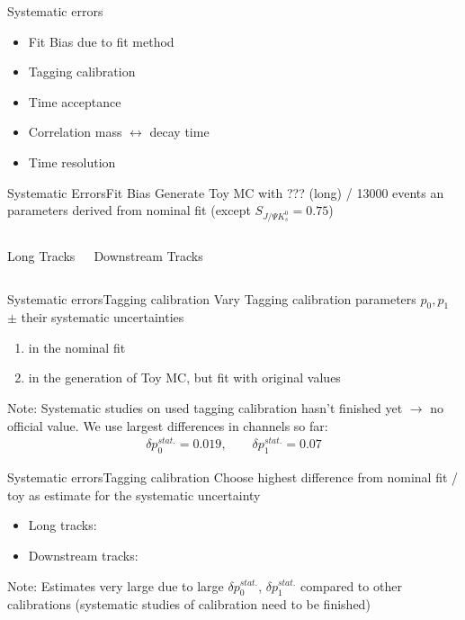 \documentclass{beamer}
\newcommand{\SJPsi}{S_{J/\Psi K_s^0}}
\begin{document}
	
	\begin{frame}{Systematic errors}
	\begin{itemize}
		\item Fit Bias due to fit method
	    \item Tagging calibration
	    \item Time acceptance
	    \item Correlation mass $\leftrightarrow$ decay time
	    \item Time resolution
	\end{itemize}
	\end{frame}
	
	\begin{frame}{Systematic Errors}{Fit Bias}
	Generate Toy MC with ??? (long) / 13000 events an parameters derived from nominal fit (except $\SJPsi = 0.75$)
	\begin{columns}
	\begin{block}{Long Tracks}
	\end{block}
	\begin{block}{Downstream Tracks}
	\end{block}
	\end{columns}
	\end{frame}
	
	\begin{frame}{Systematic errors}{Tagging calibration}
	Vary Tagging calibration parameters $p_0, p_1$ $\pm$ their systematic uncertainties
	\begin{enumerate}
	\item in the nominal fit
	\item in the generation of Toy MC, but fit with original values
	\end{enumerate}
	\begin{alert}{Note:}
	Systematic studies on used tagging calibration hasn't finished yet $\longrightarrow$ no official value. We use largest differences in channels so far:
	\begin{align*}
	\delta p_0^{stat.} = 0.019, \qquad \delta p_1^{stat.} = 0.07
	\end{align*}
	\end{alert}
	\end{frame}
	
	\begin{frame}{Systematic errors}{Tagging calibration}
	Choose highest difference from nominal fit / toy as estimate for the systematic uncertainty
	\begin{itemize}
	\item Long tracks:
	\item Downstream tracks:
    \end{itemize}		    
    \begin{alert}{Note:}
    Estimates very large due to large $\delta p_0^{stat.}$, $\delta p_1^{stat.}$ compared to other calibrations (systematic studies of calibration need to be finished)
    \end{alert}
    \end{frame}
    
\end{document}
